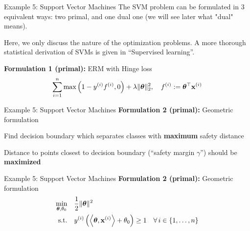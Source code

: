 \documentclass[11pt,compress,t,notes=noshow, xcolor=table]{beamer}
\begin{document}
\begin{frame2}{Example 5: Support Vector Machines}
The SVM problem can be formulated in $3$ equivalent ways: two primal, and one dual one (we will see later what "dual" means).
\begin{footnotesize}
Here, we only discuss the nature of the optimization problems. A more thorough statistical derivation of SVMs is given in ``Supervised learning''.\\
\end{footnotesize}
\spacer
\textbf{Formulation 1 (primal): } ERM with Hinge loss
$$
\sum\limits_{i=1}^n \max\left(1 - y^{(i)} f^{(i)}, 0\right) + \lambda \|\bm{\theta}\|_2^2, \quad f^{(i)} := \bm{\theta}^\top \mathbf{x}^{(i)}
$$
\end{frame2}


\begin{frame2}{Example 5: Support Vector Machines}
\textbf{Formulation 2 (primal): } Geometric formulation
\begin{itemizeL}
\item Find decision boundary which separates classes with \textbf{maximum} safety distance
\item Distance to points closest to decision boundary (\enquote{safety margin $\gamma$}) should be \textbf{maximized}
\end{itemizeL}
\vfill
{}
\end{frame2}


\begin{frame2}{Example 5: Support Vector Machines}
\textbf{Formulation 2 (primal): } Geometric formulation
$$
\begin{aligned}
\min\limits_{\bm{\theta}, \theta_0} \quad & \frac{1}{2} \|\bm{\theta}\|^2 \\
\text{s.t.} \quad & y^{(i)}  \left( \left\langle \bm{\theta}, \mathbf{x}^{(i)} \right\rangle + \theta_0 \right) \ge 1 \quad \forall\, i \in \{1, \ldots, n\}
\end{aligned}
$$
\spacer
{}
\end{frame2}
\end{document}
